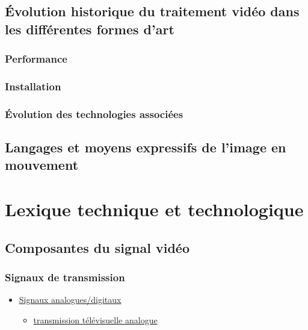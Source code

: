\documentclass[
]{book}
\providecommand{\tightlist}{%
  \setlength{\itemsep}{0pt}\setlength{\parskip}{0pt}}
\begin{document}
\hypertarget{evolution_historique}{%
\section{Évolution historique du traitement vidéo dans les différentes formes d'art}\label{evolution_historique}}

\hypertarget{evolution_historique_performance}{%
\subsection{Performance}\label{evolution_historique_performance}}

\hypertarget{evolution_historique_installation}{%
\subsection{Installation}\label{evolution_historique_installation}}

\hypertarget{evolution_historique_technologies}{%
\subsection{Évolution des technologies associées}\label{evolution_historique_technologies}}

\hypertarget{evolution_historique_language}{%
\section{Langages et moyens expressifs de l'image en mouvement}\label{evolution_historique_language}}

\hypertarget{lexique}{%
\chapter{Lexique technique et technologique}\label{lexique}}

\hypertarget{lexique_composantes}{%
\section{Composantes du signal vidéo}\label{lexique_composantes}}

\hypertarget{signaux-de-transmission}{%
\subsection{Signaux de transmission}\label{signaux-de-transmission}}

\begin{itemize}
\tightlist
\item
  \href{https://en.wikipedia.org/wiki/Video\#Analog_video}{Signaux analogues/digitaux}

  \begin{itemize}
  \tightlist
  \item
    \href{https://en.wikipedia.org/wiki/Analog_television}{transmission télévisuelle analogue}
  \end{itemize}
\end{itemize}
\end{document}
